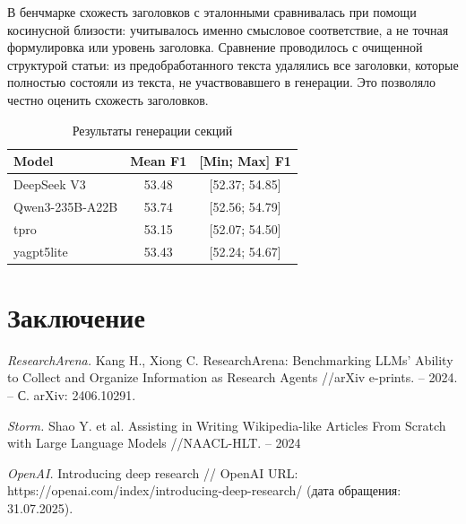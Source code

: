 \documentclass{article}
\theoremstyle{definition}
\theoremstyle{plain}
\begin{document}
В бенчмарке схожесть заголовков с эталонными сравнивалась при помощи косинусной близости: учитывалось именно смысловое соответствие, а не точная формулировка или уровень заголовка. 
Сравнение проводилось с очищенной структурой статьи: из предобработанного текста удалялись все заголовки, которые полностью состояли из текста, не участвовавшего в генерации. Это позволяло честно оценить схожесть заголовков.


\begin{table}[ht]
\centering
\caption{Результаты генерации секций}
\begin{tabular}{l|c|c}
\hline
\textbf{Model} & \textbf{Mean F1} & \textbf{[Min; Max] F1} \\
\hline
DeepSeek V3 & 53.48 & [52.37; 54.85] \\
Qwen3-235B-A22B  & 53.74 & [52.56; 54.79] \\
tpro & 53.15 & [52.07; 54.50] \\
yagpt5lite & 53.43 & [52.24; 54.67] \\
\hline
\end{tabular}
\end{table}



\section*{Заключение}


\begin{thebibliography}{99}

\textit{ResearchArena.}
Kang H., Xiong C. ResearchArena: Benchmarking LLMs' Ability to Collect and Organize Information as Research Agents //arXiv e-prints. – 2024. – С. arXiv: 2406.10291.

\textit{Storm.}
Shao Y. et al. Assisting in Writing Wikipedia-like Articles From Scratch with Large Language Models //NAACL-HLT. – 2024

\textit{OpenAI.}
Introducing deep research // OpenAI URL: https://openai.com/index/introducing-deep-research/ (дата обращения: 31.07.2025).

\end{thebibliography}

\renewcommand\refname{References}
\end{document}
